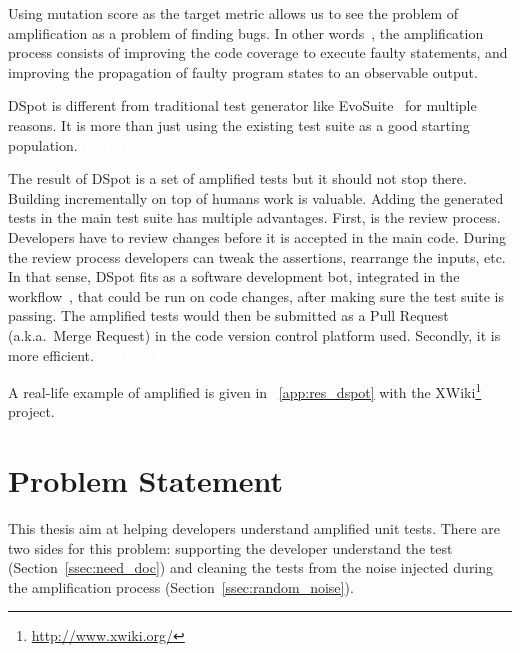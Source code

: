 \documentclass[a4paper,11pt]{sdm_internship}
\newcommand{\todo}[1]{\colorbox{Red!75}{\textcolor{white}{\textbf{TODO\ifx&#1&\else: #1\fi}}}}
\newcommand{\dspot}{DSpot\xspace}
\theoremstyle{definition}
\begin{document}
Using mutation score as the target metric allows us to see the problem of amplification as a problem of finding bugs.
In other words~\cite{shamshiri2015automatically}, the amplification process consists of improving the code coverage to execute faulty statements, and improving the propagation of faulty program states to an observable output.

\dspot{} is different from traditional test generator like EvoSuite~\cite{fraser2011evosuite} for multiple reasons.
It is more than just using the existing test suite as a good starting population.
\todo{}
\cite{rojas2017detailed}

The result of \dspot{} is a set of amplified tests but it should not stop there.
Building incrementally on top of humans work is valuable.
Adding the generated tests in the main test suite has multiple advantages.
First, is the review process.
Developers have to review changes before it is accepted in the main code.
During the review process developers can tweak the assertions, rearrange the inputs, etc.
In that sense, \dspot{} fits as a software development bot, integrated in the workflow~\cite{urli2018design}, that could be run on code changes, after making sure the test suite is passing.
The amplified tests would then be submitted as a Pull Request (a.k.a.\ Merge Request) in the code version control platform used.
Secondly, it is more efficient.\todo{}

A real-life example of amplified is given in \appendixname~\ref{app:res_dspot} with the XWiki\footnote{\url{http://www.xwiki.org/}} project.


\section{Problem Statement}%
\label{sec:problem_statement}
This thesis aim at helping developers understand amplified unit tests.
There are two sides for this problem: supporting the developer understand the test (Section~\ref{ssec:need_doc}) and cleaning the tests from the noise injected during the amplification process (Section~\ref{ssec:random_noise}).

\end{document}
